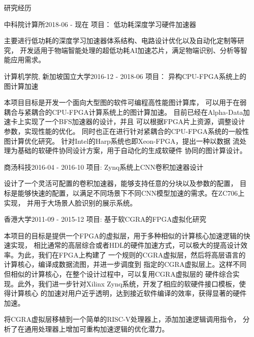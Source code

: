 \documentclass{resume} %
\begin{document}
\begin{rSection}{研究经历}
\begin{rSubsection}{中科院计算所}{2018-06 - 现在}{
        项目： 低功耗深度学习硬件加速器}{}
\item 主要进行低功耗的深度学习加速器体系结构、电路设计优化以及自动化定制等研究，
	开发适用于物端智能处理的超低功耗AI加速芯片，满足物端识别、分析等智能应用需求。
\end{rSubsection}


\begin{rSubsection}{计算机学院, 新加坡国立大学}{2016-12 - 2018-06}{
        项目： 异构CPU-FPGA系统上的图计算加速}{}
\item 本项目目标是开发一个面向大型图的软件可编程高性能图计算库，
    可以用于在弱耦合与紧耦合的CPU-FPGA计算系统上的图计算加速。
    目前已经在Alpha-Data加速卡上实现了一个BFS加速器的设计，并且
    可以根据FPGA片上资源，调整设计参数，实现性能的优化。
    同时也正在进行针对紧耦合的CPU-FPGA系统的一般性图计算优化研究。
	针对Intel的Harp系统也即Xeon-FPGA，提出一种以数据
	流处理为基础的软硬件协同设计方案，用于自动化的生成软硬件
	协同的图计算设计。
\end{rSubsection}

\begin{rSubsection}{商汤科技}{2016-04 - 2016-10}{
        项目: Zynq系统上CNN卷积加速器设计}{}
\item 设计了一个灵活可配置的卷积加速器，能够支持任意的分块以及参数的配置，
    目标是能够快速的配置，以满足不同场景下不同CNN模型加速的需求。在ZC706上实现，
    并用于大场景人脸识别的展示系统。
\end{rSubsection}

\begin{rSubsection}{香港大学}{2011-09 - 2015-12}{
        项目: 基于软CGRA的FPGA虚拟化研究}{}
\item 本项目的目标是提供一个FPGA的虚拟层，用于多种相似的计算核心加速逻辑的快速实现，
    相比通常的高层综合或者HDL的硬件加速方式，可以极大的提高设计效率。为此，我们在FPGA上构建了
    一个规则的CGRA虚拟层，然后将高层语言的计算核心，编译成数据流图，并进一步调度到
    指定的CGRA虚拟层上。这样不同但相似的计算核心，在整个设计过程中，可以复用CGRA虚拟层的
    硬件综合实现。此外，我们进一步针对Xilinx Zynq系统，开发了相应的软硬件接口模板，使得计算核心
    的加速对用户近乎透明，达到接近软件编译的效率，获得显著的硬件加速。
\\
\item 将CGRA虚拟层移植到一个简单的RISC-V处理器上，添加加速逻辑调用指令，
    分析了在通用处理器上增加可重构加速逻辑的优化潜力。 
\end{rSubsection}


\end{rSection}
\end{document}
